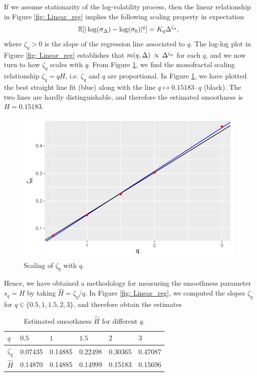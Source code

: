  If we assume stationarity of the log-volatility process, then the linear relationship in Figure \ref{fig: Linear_reg} implies the following scaling property in expectation
 \begin{equation}\label{eq:scaling}
     \mathbb{E}[|\log(\sigma_{\Delta})-\log(\sigma_{0})|^{q}]=K_{q}\Delta^{\zeta_{q}},
 \end{equation}
 where $\zeta_{q}>0$ is the slope of the regression line associated to $q$. The log-log plot in Figure \ref{fig: Linear_reg} establishes that $m(q,\Delta)\hspace{2 pt}\propto\hspace{2 pt} \Delta^{\zeta_{q}}$ for each $q$, and we now turn to how $\zeta_{q}$ scales with $q$. From Figure \ref{fig:slope_plot}, we find the monofractal scaling relationship $\zeta_{q}=qH$, i.e. $\zeta_{q}$ and $q$ are proportional. In Figure \ref{fig:slope_plot}, we have plotted the best straight line fit (blue) along with the line $q\mapsto 0.15183\cdot q$ (black). The two lines are hardly distinguishable, and therefore the estimated smoothness is $H=0.15183$. 
 \begin{figure}[H]
     \centering
     \includegraphics[scale=0.75]{fig/img/RealizedLib/slope_plot.pdf}
     \caption{Scaling of $\zeta_{q}$ with $q$.}
     \label{fig:slope_plot}
 \end{figure}
 Hence, we have obtained a methodology for measuring the smoothness parameter $s_{q}=H$ by taking $\hat{H}=\zeta_{q}/q$. In Figure \ref{fig: Linear_reg}, we computed the slopes $\zeta_{q}$ for $q\in\{0.5,1, 1.5,2,3\}$, and therefore obtain the estimates
 \begin{table}[H]
\centering
\begin{tabular}{@{}llllll@{}}
\toprule
$q$  & $0.5$   & $1$   & $1.5$ & $2$ & $3$ \\ \midrule 
$\zeta_{q}$ & 0.07435 & 0.14885 & 0.22498     & 0.30365  & 0.47087 \\  \midrule
$\hat{H}$ & 0.14870 & 0.14885 & 0.14999 & 0.15183 & 0.15696 \\ \bottomrule
\end{tabular}
\caption{Estimated smoothness $\hat{H}$ for different $q$.}
\label{heston_tab}
\end{table}
